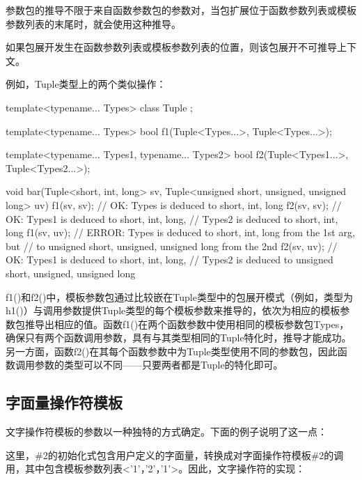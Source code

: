 参数包的推导不限于来自函数参数包的参数对，当包扩展位于函数参数列表或模板参数列表的末尾时，就会使用这种推导。

\begin{notice}
如果包展开发生在函数参数列表或模板参数列表的位置，则该包展开不可推导上下文。
\end{notice}

例如，Tuple类型上的两个类似操作：

\begin{cpp}
template<typename... Types> class Tuple { };

template<typename... Types>
bool f1(Tuple<Types...>, Tuple<Types...>);

template<typename... Types1, typename... Types2>
bool f2(Tuple<Types1...>, Tuple<Types2...>);

void bar(Tuple<short, int, long> sv,
		Tuple<unsigned short, unsigned, unsigned long> uv)
{
	f1(sv, sv); // OK: Types is deduced to {short, int, long}
	f2(sv, sv); // OK: Types1 is deduced to {short, int, long},
				// Types2 is deduced to {short, int, long}
	f1(sv, uv); // ERROR: Types is deduced to {short, int, long} from the 1st arg, but
				// to {unsigned short, unsigned, unsigned long} from the 2nd
	f2(sv, uv); // OK: Types1 is deduced to {short, int, long},
				// Types2 is deduced to {unsigned short, unsigned, unsigned long}
}
\end{cpp}

f1()和f2()中，模板参数包通过比较嵌在Tuple类型中的包展开模式（例如，类型为h1()）与调用参数提供Tuple类型的每个模板参数来推导的，依次为相应的模板参数包推导出相应的值。函数f1()在两个函数参数中使用相同的模板参数包Types，确保只有两个函数调用参数，具有与其类型相同的Tuple特化时，推导才能成功。另一方面，函数f2()在其每个函数参数中为Tuple类型使用不同的参数包，因此函数调用参数的类型可以不同——只要两者都是Tuple的特化即可。

\subsection{字面量操作符模板}

文字操作符模板的参数以一种独特的方式确定。下面的例子说明了这一点：


这里，\#2的初始化式包含用户定义的字面量，转换成对字面操作符模板\#2的调用，其中包含模板参数列表<'1'，'2'，'1'>。因此，文字操作符的实现：

